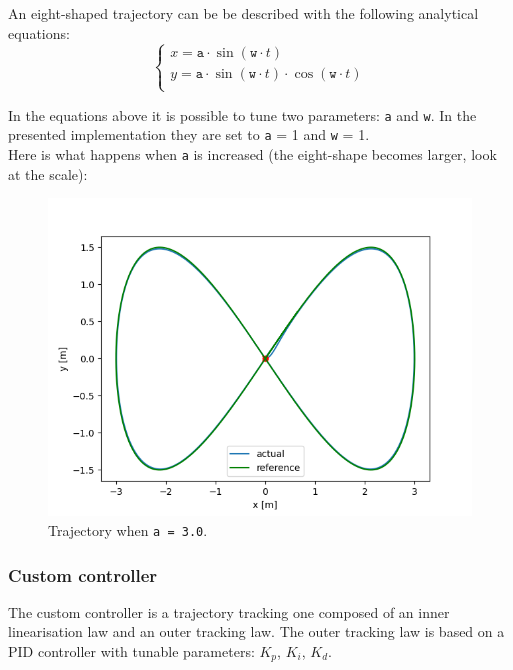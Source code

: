 \documentclass[11pt,a4paper]{article}
\begin{document}
An eight-shaped trajectory can be be described with the following analytical equations:
$$
\begin{cases}
    x = \texttt{a} \cdot \sin (\texttt{w} \cdot t)\\
    y = \texttt{a} \cdot \sin (\texttt{w} \cdot t)\cdot \cos (\texttt{w} \cdot t)\\
\end{cases}
$$

In the equations above it is possible to tune two parameters: \texttt{a} and \texttt{w}.
In the presented implementation they are set to \texttt{a} = 1 and \texttt{w} = 1.\\

Here is what happens when \texttt{a} is increased (the eight-shape becomes larger, look at the scale):

\begin{figure}[H]
    \centering
    \includegraphics[scale=0.5]{different_params/custom_a3/Trajectory.png}
    \caption{Trajectory when \texttt{a = 3.0}.}
\end{figure}

\subsubsection{Custom controller}

The custom controller is a trajectory tracking one composed of an inner linearisation law and
an outer tracking law.
The outer tracking law is based on a PID controller with tunable parameters: $K_p$, $K_i$, $K_d$.\\
\end{document}

